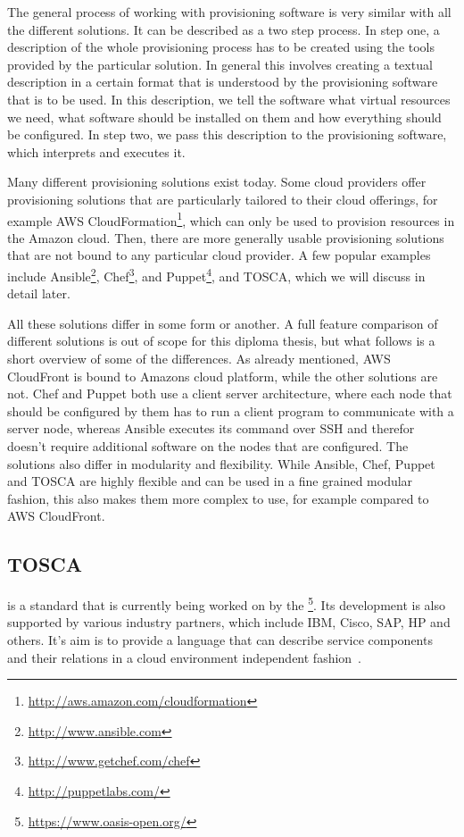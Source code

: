 The general process of working with provisioning software is very similar with all the different solutions.
It can be described as a two step process.
In step one, a description of the whole provisioning process has to be created using the tools provided by the particular solution.
In general this involves creating a textual description in a certain format that is understood by the provisioning software that is to be used.
In this description, we tell the software what virtual resources we need, what software should be installed on them and how everything should be configured.
In step two, we pass this description to the provisioning software, which interprets and executes it.

Many different provisioning solutions exist today.
Some cloud providers offer provisioning solutions that are particularly tailored to their cloud offerings, for example AWS CloudFormation\footnote{\url{http://aws.amazon.com/cloudformation}}, which can only be used to provision resources in the Amazon cloud.
Then, there are more generally usable provisioning solutions that are not bound to any particular cloud provider.
A few popular examples include Ansible\footnote{\url{http://www.ansible.com}}, Chef\footnote{\url{http://www.getchef.com/chef}}, and Puppet\footnote{\url{http://puppetlabs.com/}}, and TOSCA, which we will discuss in detail later.

All these solutions differ in some form or another.
A full feature comparison of different solutions is out of scope for this diploma thesis, but what follows is a short overview of some of the differences.
As already mentioned, AWS CloudFront is bound to Amazons cloud platform, while the other solutions are not.
Chef and Puppet both use a client server architecture, where each node that should be configured by them has to run a client program to communicate with a server node, whereas Ansible executes its command over SSH and therefor doesn't require additional software on the nodes that are configured.
The solutions also differ in modularity and flexibility. While Ansible, Chef, Puppet and TOSCA are highly flexible and can be used in a fine grained modular fashion, this also makes them more complex to use, for example compared to AWS CloudFront.

\subsection{TOSCA}

 is a standard that is currently being worked on by the \footnote{\url{https://www.oasis-open.org/}}.
Its development is also supported by various industry partners, which include IBM, Cisco, SAP, HP and others.
It's aim is to provide a language that can describe service components and their relations in a cloud environment independent fashion~\autocite{tosca:spec}.

